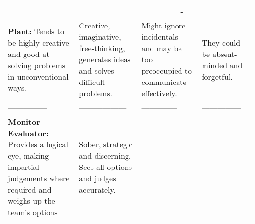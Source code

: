 \documentclass[]{book}
\begin{document}
\begin{longtable}[]{@{}llll@{}}
\begin{minipage}[t]{0.25\columnwidth}
------------------\strut
\end{minipage} & \begin{minipage}[t]{0.20\columnwidth}\raggedright
--------------\strut
\end{minipage} & \begin{minipage}[t]{0.22\columnwidth}\raggedright
----------------\strut
\end{minipage}\tabularnewline
\begin{minipage}[t]{0.21\columnwidth}\raggedright
\textbf{Plant:} Tends to be highly creative and good at solving problems in unconventional ways.\strut
\end{minipage} & \begin{minipage}[t]{0.25\columnwidth}\raggedright
Creative, imaginative, free-thinking, generates ideas and solves difficult problems.\strut
\end{minipage} & \begin{minipage}[t]{0.20\columnwidth}\raggedright
Might ignore incidentals, and may be too preoccupied to communicate effectively.\strut
\end{minipage} & \begin{minipage}[t]{0.22\columnwidth}\raggedright
They could be absent-minded and forgetful.\strut
\end{minipage}\tabularnewline
\begin{minipage}[t]{0.21\columnwidth}\raggedright
---------------\strut
\end{minipage} & \begin{minipage}[t]{0.25\columnwidth}\raggedright
------------------\strut
\end{minipage} & \begin{minipage}[t]{0.20\columnwidth}\raggedright
--------------\strut
\end{minipage} & \begin{minipage}[t]{0.22\columnwidth}\raggedright
----------------\strut
\end{minipage}\tabularnewline
\begin{minipage}[t]{0.21\columnwidth}\raggedright
\textbf{Monitor Evaluator:} Provides a logical eye, making impartial judgements where required and weighs up the team's options\strut
\end{minipage} & \begin{minipage}[t]{0.25\columnwidth}\raggedright
Sober, strategic and discerning. Sees all options and judges accurately.\strut
\end{minipage} & \begin{minipage}[t]{0.20\columnwidth}\raggedright

\end{minipage}
\end{longtable}
\end{document}
